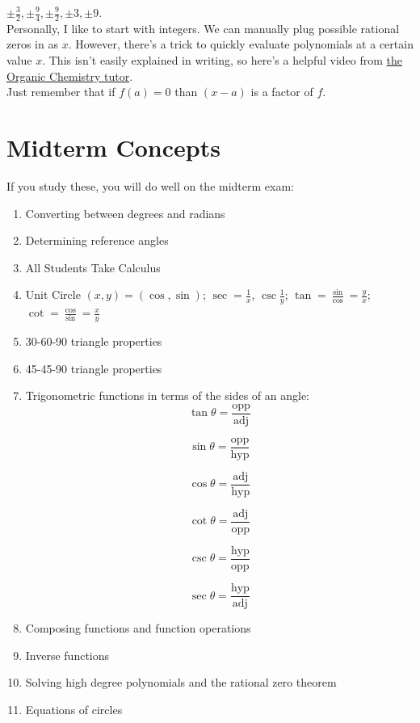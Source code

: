 \documentclass[12pt]{article}
\begin{document}
\(\pm\frac{3}{2}, \pm\frac{9}{4}, \pm\frac{9}{2},\pm3, \pm9\).\\


Personally, I like to start with integers. We can manually plug possible rational zeros in as \(x\). However, there's a trick to quickly evaluate polynomials at a certain value \(x\). This isn't easily explained in writing, so here's a helpful video from \href{https://www.youtube.com/watch?app=desktop&v=FxHWoUOq2iQ}{the Organic Chemistry tutor}. \\

Just remember that if \(f(a)=0\) than \((x-a)\) is a factor of \(f\).\\

\section{Midterm Concepts}

If you study these, you will do well on the midterm exam:

\begin{enumerate}
	\item Converting between degrees and radians
	\item Determining reference angles
	\item All Students Take Calculus
	\item Unit Circle \((x,y)=(\cos,\sin)\); \(\sec=\frac{1}{x}\), \(\csc\frac{1}{y}\); \(\tan=\frac{\sin}{\cos}=\frac{y}{x}\); \(\cot=\frac{\cos}{\sin}=\frac{x}{y}\)
	\item 30-60-90 triangle properties
	\item 45-45-90 triangle properties
	\item Trigonometric functions in terms of the sides of an angle:
		\[
		\tan \theta = \frac{\text{opp}}{\text{adj}}
		\]
		
		\[
		\sin \theta = \frac{\text{opp}}{\text{hyp}}
		\]
		
		\[
		\cos \theta = \frac{\text{adj}}{\text{hyp}}
		\]
		
		\[
		\cot \theta = \frac{\text{adj}}{\text{opp}}
		\]
		
		\[
		\csc \theta = \frac{\text{hyp}}{\text{opp}}
		\]
		
		\[
		\sec \theta = \frac{\text{hyp}}{\text{adj}}
		\]
	\item Composing functions and function operations
	\item Inverse functions
	\item Solving high degree polynomials and the rational zero theorem
	\item Equations of circles
\end{enumerate}
\end{document}
